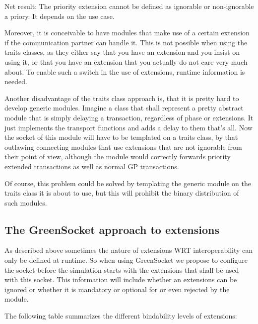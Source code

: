 \documentclass[a4paper,10pt]{article}          %
\begin{document}
Net result: The priority extension cannot be defined as ignorable or non-ignorable a priory. It depends on the use case. 

Moreover, it is conceivable to have modules that make use of a certain extension if the communication partner can handle it. This is not possible when using the traits classes, as they either say that you have an extension and you insist on using it, or that you have an extension that you actually do not care very much about. To enable such a switch in the use of extensions, runtime information is needed.

Another disadvantage of the traits class approach is, that it is pretty hard to develop generic modules. Imagine a class that shall represent a pretty abstract module that is simply delaying a transaction, regardless of phase or extensions. It just implements the transport functions and adds a delay to them that's all. Now the socket of this module will have to be templated on a traits class, by that outlawing connecting modules that use extensions that are not ignorable from their point of view, although the module would correctly forwards priority extended transactions as well as normal GP transactions.

Of course, this problem could be solved by templating the generic module on the traits class it is about to use, but this will prohibit the binary distribution of such modules.

\vspace{4mm}
\subsection{The GreenSocket approach to extensions}
\vspace{4mm}

As described above sometimes the nature of extensions WRT interoperability can only be defined at runtime. So when using GreenSocket we propose to configure the socket before the simulation starts with the extensions that shall be used with this socket. This information will include whether an extensions can be ignored or whether it is mandatory or optional for or even rejected by the module.

The following table summarizes the different bindability levels of extensions:
\end{document}
